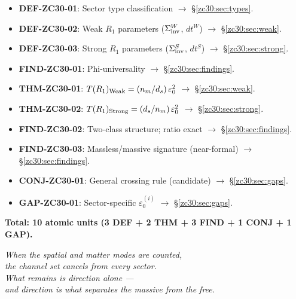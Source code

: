 \documentclass[12pt, a4paper]{article}
\begin{document}
\begin{formalbox}[title={Atomic Units Introduced by TASK-ZC30 (9 units)}]
\begin{itemize}[leftmargin=*, noitemsep]
  \item \textbf{DEF-ZC30-01}: Sector type classification
    $\to$ \S\ref{zc30:sec:types}.
  \item \textbf{DEF-ZC30-02}: Weak $R_1$ parameters
    ($\Sigma_{\rm inv}^W$, $dt^W$)
    $\to$ \S\ref{zc30:sec:weak}.
  \item \textbf{DEF-ZC30-03}: Strong $R_1$ parameters
    ($\Sigma_{\rm inv}^S$, $dt^S$)
    $\to$ \S\ref{zc30:sec:strong}.
  \item \textbf{FIND-ZC30-01}: Phi-universality
    $\to$ \S\ref{zc30:sec:findings}.
  \item \textbf{THM-ZC30-01}: $T(R_1)_{\rm Weak} = (n_m/d_s)\,\varepsilon_0^2$
    $\to$ \S\ref{zc30:sec:weak}.
  \item \textbf{THM-ZC30-02}: $T(R_1)_{\rm Strong} = (d_s/n_m)\,\varepsilon_0^2$
    $\to$ \S\ref{zc30:sec:strong}.
  \item \textbf{FIND-ZC30-02}: Two-class structure; ratio exact
    $\to$ \S\ref{zc30:sec:findings}.
  \item \textbf{FIND-ZC30-03}: Massless/massive signature (near-formal)
    $\to$ \S\ref{zc30:sec:findings}.
  \item \textbf{CONJ-ZC30-01}: General crossing rule (candidate)
    $\to$ \S\ref{zc30:sec:gaps}.
  \item \textbf{GAP-ZC30-01}: Sector-specific $\varepsilon_0^{(i)}$
    $\to$ \S\ref{zc30:sec:gaps}.
\end{itemize}
\textbf{Total: 10 atomic units (3 DEF + 2 THM + 3 FIND +
  1 CONJ + 1 GAP).}
\end{formalbox}

\bigskip
\begin{center}
\textit{%
  When the spatial and matter modes are counted,\\
  the channel set cancels from every sector.\\
  What remains is direction alone ---\\
  and direction is what separates the massive from the free.}
\end{center}

\end{document}
